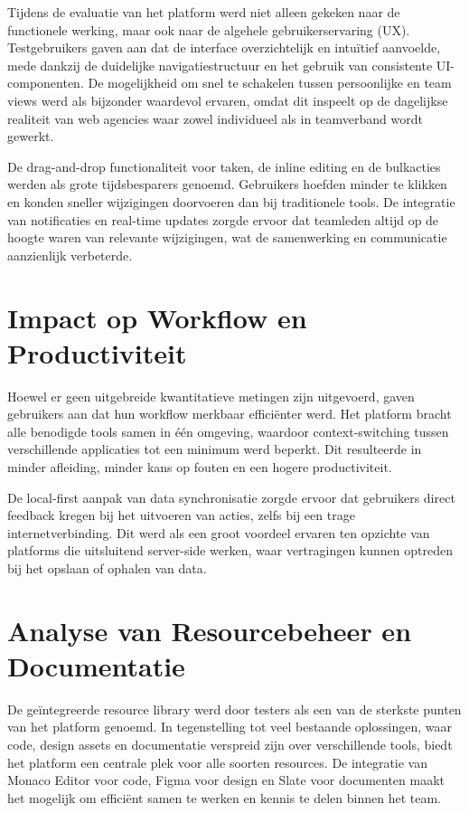 Tijdens de evaluatie van het platform werd niet alleen gekeken naar de functionele werking, maar ook naar de algehele gebruikerservaring (UX). Testgebruikers gaven aan dat de interface overzichtelijk en intuïtief aanvoelde, mede dankzij de duidelijke navigatiestructuur en het gebruik van consistente UI-componenten. De mogelijkheid om snel te schakelen tussen persoonlijke en team views werd als bijzonder waardevol ervaren, omdat dit inspeelt op de dagelijkse realiteit van web agencies waar zowel individueel als in teamverband wordt gewerkt.

De drag-and-drop functionaliteit voor taken, de inline editing en de bulkacties werden als grote tijdsbesparers genoemd. Gebruikers hoefden minder te klikken en konden sneller wijzigingen doorvoeren dan bij traditionele tools. De integratie van notificaties en real-time updates zorgde ervoor dat teamleden altijd op de hoogte waren van relevante wijzigingen, wat de samenwerking en communicatie aanzienlijk verbeterde.

\section{Impact op Workflow en Productiviteit}
\label{sec:impact-workflow}

Hoewel er geen uitgebreide kwantitatieve metingen zijn uitgevoerd, gaven gebruikers aan dat hun workflow merkbaar efficiënter werd. Het platform bracht alle benodigde tools samen in één omgeving, waardoor context-switching tussen verschillende applicaties tot een minimum werd beperkt. Dit resulteerde in minder afleiding, minder kans op fouten en een hogere productiviteit.

De local-first aanpak van data synchronisatie zorgde ervoor dat gebruikers direct feedback kregen bij het uitvoeren van acties, zelfs bij een trage internetverbinding. Dit werd als een groot voordeel ervaren ten opzichte van platforms die uitsluitend server-side werken, waar vertragingen kunnen optreden bij het opslaan of ophalen van data.

\section{Analyse van Resourcebeheer en Documentatie}
\label{sec:analyse-resourcebeheer}

De geïntegreerde resource library werd door testers als een van de sterkste punten van het platform genoemd. In tegenstelling tot veel bestaande oplossingen, waar code, design assets en documentatie verspreid zijn over verschillende tools, biedt het platform een centrale plek voor alle soorten resources. De integratie van Monaco Editor voor code, Figma voor design en Slate voor documenten maakt het mogelijk om efficiënt samen te werken en kennis te delen binnen het team.

